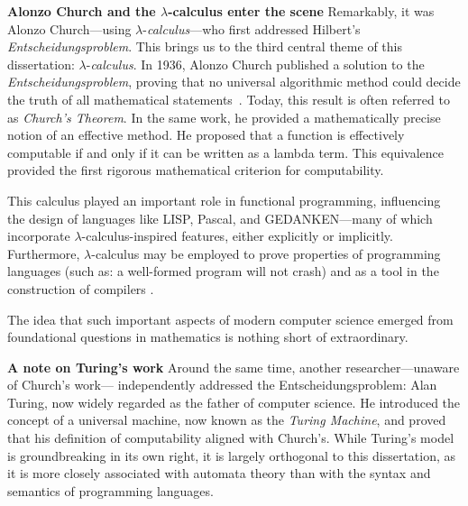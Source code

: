    

\noindent \textbf{Alonzo Church and the $\lambda$-calculus enter the scene}
Remarkably, it was Alonzo Church—using $\lambda$-\textit{calculus}—who first addressed Hilbert’s \emph{Entscheidungsproblem}. This brings us to the third central theme of this dissertation: $\lambda$-\textit{calculus}. In 1936, Alonzo Church published a solution to the \emph{Entscheidungsproblem}, proving that no universal algorithmic method could decide the truth of all mathematical statements~\cite{church1936}. Today, this result is often referred to as \emph{Church’s Theorem}. In the same work, he provided a mathematically precise notion of an effective method. He proposed that a function is effectively computable if and only if it can be written as a lambda term. This equivalence provided the first rigorous mathematical criterion for computability.

This calculus played an important role in functional programming, influencing the design of languages like LISP, Pascal, and GEDANKEN—many of which incorporate $\lambda$-calculus-inspired features, either explicitly or implicitly. Furthermore, $\lambda$-calculus may be employed to prove properties of programming languages (such as: a well-formed program will not crash) and as a tool in the construction of compilers \cite{jonesImplementationFunctionalProgramming}.

The idea that such important aspects of modern computer science emerged from foundational questions in mathematics is nothing short of extraordinary.

\noindent \textbf{A note on Turing's work}
Around the same time, another researcher—unaware of Church’s work— independently addressed the Entscheidungsproblem: Alan Turing, now widely regarded as the father of computer science. He introduced the concept of a universal machine, now known as the \emph{Turing Machine}, and proved that his definition of computability aligned with Church’s. While Turing’s model is groundbreaking in its own right, it is largely orthogonal to this dissertation, as it is more closely associated with automata theory than with the syntax and semantics of programming languages.



